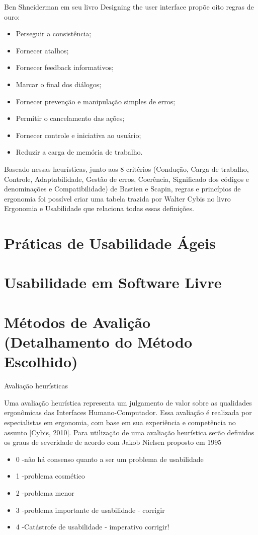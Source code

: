 Ben Shneiderman em seu livro Designing the user interface propõe oito regras de ouro:
\begin{itemize} 
\item Perseguir a consistência;
\item Fornecer atalhos;
\item Fornecer feedback informativos;
\item Marcar o final dos diálogos;
\item Fornecer prevenção e manipulação simples de erros;
\item Permitir o cancelamento das ações;
\item Fornecer controle e iniciativa ao usuário;
\item Reduzir a carga de memória de trabalho.
\end{itemize}

Baseado nessas heurísticas, junto aos 8 critérios (Condução, Carga de trabalho, Controle, Adaptabilidade, Gestão de erros, Coerência, Significado dos códigos e denominações e Compatibilidade) de Bastien e Scapin, regras e princípios de ergonomia foi possível criar uma tabela trazida por Walter Cybis no livro Ergonomia e Usabilidade que relaciona todas essas definições.

\section{Práticas de Usabilidade Ágeis}

\section{Usabilidade em Software Livre}

\section{Métodos de Avalição (Detalhamento do Método Escolhido)}
Avaliação heurísticas

Uma avaliação heurística representa um julgamento de valor sobre as qualidades ergonômicas das Interfaces Humano-Computador. Essa avaliação é realizada por especialistas em ergonomia, com base em sua experiência e competência no assunto [Cybis, 2010].
Para utilização de uma avaliação heurística serão definidos os graus de severidade de acordo com Jakob Nielsen proposto em 1995
\begin{itemize}
\item 0 -não há consenso quanto a ser um problema de usabilidade
\item 1 -problema cosmético
\item 2 -problema menor
\item 3 -problema importante de usabilidade - corrigir
\item 4 -Catástrofe de usabilidade - imperativo corrigir!
\end{itemize}

